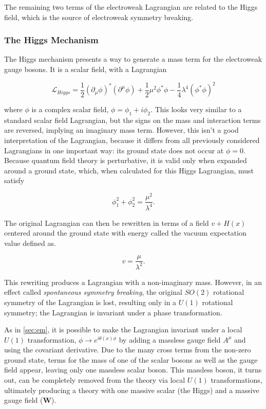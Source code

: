 The remaining two terms of the electroweak Lagrangian are related to the Higgs field, which is the source of electroweak symmetry breaking. 

\subsubsection{The Higgs Mechanism}

The Higgs mechanism presents a way to generate a mass term for the electroweak gauge bosons. It is a scalar field, with a Lagrangian 

\begin{equation}
\mathcal{L}_{Higgs} = \frac{1}{2}(\partial_\mu\phi)^*(\partial^\mu\phi) + \frac{1}{2}\mu^2\phi^*\phi - \frac{1}{4}\lambda^4(\phi^*\phi)^2
\end{equation}

where $\phi$ is a complex scalar field, $\phi = \phi_1 + i\phi_2$. This looks very similar to a standard scalar field Lagrangian, but the signs on the mass and interaction terms are reversed, implying an imaginary mass term. However, this isn't a good interpretation of the Lagrangian, because it differs from all previously considered Lagrangians in one important way: its ground state does not occur at $\phi = 0$. Because quantum field theory is perturbative, it is valid only when expanded around a ground state, which, when calculated for this Higgs Lagrangian, must satisfy

\begin{equation}
\phi_1^2 + \phi_2^2 = \frac{\mu^2}{\lambda^4} . 
\end{equation}

The original Lagrangian can then be rewritten in terms of a field $v + H(x)$ centered around the ground state with energy called the vacuum expectation value defined as. 

\begin{equation}
v = \frac{\mu}{\lambda^2} . 
\end{equation}

This rewriting produces a Lagrangian with a non-imaginary mass. However, in an effect called \textit{spontaneous symmetry breaking}, the original $SO(2)$ rotational symmetry of the Lagrangian is lost, resulting only in a $U(1)$ rotational symmetry; the Lagrangian is invariant under a phase transformation.

As in \autoref{sec:em}, it is possible to make the Lagrangian invariant under a local $U(1)$ transformation, $\phi \rightarrow e^{i\theta(x)\phi}$ by adding a massless gauge field $A^\mu$ and using the covariant derivative. Due to the many cross terms from the non-zero ground state, terms for the mass of one of the scalar bosons as well as the gauge field appear, leaving only one massless scalar boson. This massless boson, it turns out, can be completely removed from the theory via local $U(1)$ transformations, ultimately producing a theory with one massive scalar (the Higgs) and a massive gauge field ($\bm{W}$). 

